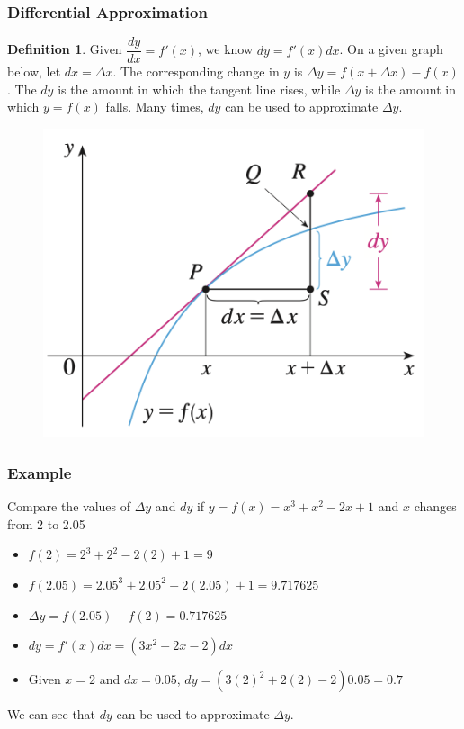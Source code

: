 \documentclass[t]{beamer}
\theoremstyle{plain}
\theoremstyle{definition}
\newtheorem{dfn}{Definition}
\begin{document}
\frame
{
\frametitle{Differential Approximation}

\footnotesize

\begin{dfn}
Given $\dfrac{dy}{dx} = f'(x)$, we know $dy = f'(x)dx$.      On a given graph below, let $dx = \Delta{x}$.  The corresponding change in $y$ is $\Delta{y} = f(x + \Delta{x}) - f(x)$.     The $dy$ is the amount in which the tangent line rises, while $\Delta{y}$  is the amount in which $y=f(x)$ falls.   Many times, $dy$ can be used to approximate $\Delta{y}$.
\end{dfn}

\begin{figure}[t]
\begin{center}
\includegraphics[scale=0.27]{fig/differentials}
\end{center}
\end{figure}

}

\begin{frame}

\frametitle{Example}

Compare the values of $\Delta{y}$ and $dy$ if $y=f(x) = x^3 + x^2 - 2x + 1$ and $x$ changes from 2 to 2.05 \pause

\begin{itemize}
	\item $f(2) = 2^3 + 2^2 - 2(2) + 1 = 9$
	\item $f(2.05) = 2.05^3 + 2.05^2 - 2(2.05) + 1 = 9.717625$
	\item $\Delta{y} = f(2.05) - f(2) = 0.717625$
	\item $dy = f'(x)dx = (3x^2 + 2x - 2)dx$
	\item Given $x=2$ and $dx = 0.05$, $dy = (3(2)^2 + 2(2) -2)0.05 = 0.7$
\end{itemize}

We can see that $dy$ can be used to approximate $\Delta{y}$.

\end{frame}
\end{document}
